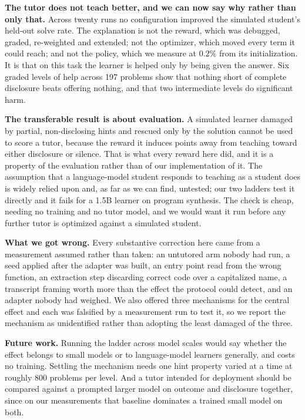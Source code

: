 \documentclass[conference]{IEEEtran}
\begin{document}
\textbf{The tutor does not teach better, and we can now say why rather than
only that.} Across twenty runs no configuration improved the simulated
student's held-out solve rate. The explanation is not the reward, which was
debugged, graded, re-weighted and extended; not the optimizer, which moved
every term it could reach; and not the policy, which we measure at $0.2\%$ from
its initialization. It is that on this task the learner is helped only by being
given the answer. Six graded levels of help across 197 problems show that
nothing short of complete disclosure beats offering nothing, and that two
intermediate levels do significant harm.

\textbf{The transferable result is about evaluation.} A simulated learner
damaged by partial, non-disclosing hints and rescued only by the solution
cannot be used to score a tutor, because the reward it induces points away from
teaching toward either disclosure or silence. That is what every reward here
did, and it is a property of the evaluation rather than of our implementation
of it. The assumption that a language-model student responds to teaching as a
student does is widely relied upon and, as far as we can find, untested; our
two ladders test it directly and it fails for a 1.5B learner on program
synthesis. The check is cheap, needing no training and no tutor model, and we
would want it run before any further tutor is optimized against a simulated
student.

\textbf{What we got wrong.} Every substantive correction here came from a
measurement assumed rather than taken: an untutored arm nobody had run, a seed
applied after the adapter was built, an entry point read from the wrong
function, an extraction step discarding correct code over a capitalized name, a
transcript framing worth more than the effect the protocol could detect, and an
adapter nobody had weighed. We also offered three mechanisms for the central
effect and each was falsified by a measurement run to test it, so we report the
mechanism as unidentified rather than adopting the least damaged of the three.

\textbf{Future work.} Running the ladder across model scales would say whether
the effect belongs to small models or to language-model learners generally, and
costs no training. Settling the mechanism needs one hint property varied at a
time at roughly 800 problems per level. And a tutor intended for deployment
should be compared against a prompted larger model on outcome and disclosure
together, since on our measurements that baseline dominates a trained small
model on both.
\end{document}

